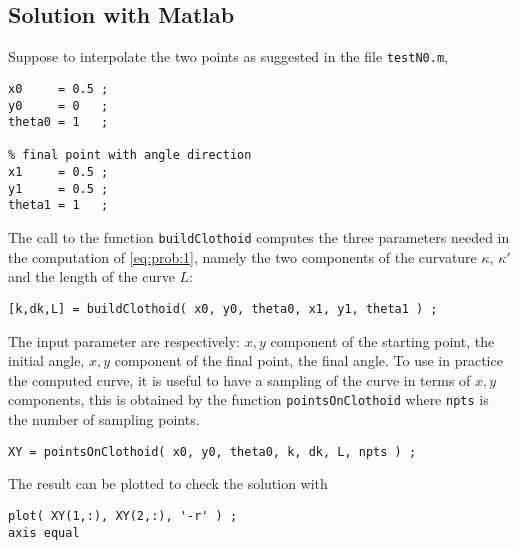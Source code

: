 \documentclass[preprint,3p]{elsarticle}
\begin{document}
\subsection{Solution with Matlab}
Suppose to interpolate the two points as suggested in the file \texttt{testN0.m},
\begin{lstlisting}[breaklines, backgroundcolor=\color{gray!10},basicstyle=\small\ttfamily]
% initial point with angle direction
x0     = 0.5 ;
y0     = 0   ;
theta0 = 1   ;

% final point with angle direction
x1     = 0.5 ;
y1     = 0.5 ;
theta1 = 1   ;
\end{lstlisting}
The call to the function \texttt{buildClothoid} computes the three parameters needed in the computation of \eqref{eq:prob:1}, namely the two components of the curvature $\kappa$, $\kappa'$ and the length of the curve $L$:
\begin{lstlisting}[breaklines, backgroundcolor=\color{gray!10},basicstyle=\small\ttfamily]
% compute clothoid parameters
[k,dk,L] = buildClothoid( x0, y0, theta0, x1, y1, theta1 ) ;
\end{lstlisting}
The input parameter are respectively: $x,y$ component of the starting point, the initial angle, $x,y$ component of the final point, the final angle.
To use in practice the computed curve, it is useful to have a sampling of the curve in terms of $x,y$ components, this is obtained by the function \texttt{pointsOnClothoid} where \texttt{npts} is the number of sampling points.
\begin{lstlisting}[breaklines, backgroundcolor=\color{gray!10},basicstyle=\small\ttfamily]
% compute points on clothoid
XY = pointsOnClothoid( x0, y0, theta0, k, dk, L, npts ) ;
\end{lstlisting}
The result can be plotted to check the solution with
\begin{lstlisting}[breaklines, backgroundcolor=\color{gray!10},basicstyle=\small\ttfamily]
% plot solution
plot( XY(1,:), XY(2,:), '-r' ) ;
axis equal
\end{lstlisting}
\end{document}
